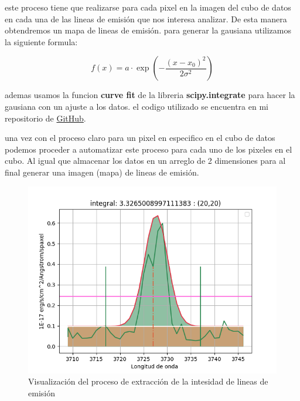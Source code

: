 \documentclass[9pt,twocolumn,a4paper]{opticajnl}
\begin{document}
este proceso tiene que realizarse para cada pixel en la imagen del cubo de datos en cada una de las lineas de emisión que nos interesa analizar. De esta manera obtendremos un mapa de lineas de emisión.
para generar la gausiana utilizamos la siguiente formula:

$$
f(x) = a \cdot \exp\left( -\frac{(x - x_0)^2}{2\sigma^2} \right)
$$

ademas usamos la funcion \textbf{curve fit} de la libreria \textbf{scipy.integrate} para hacer la gausiana con un ajuste a los datos.
el codigo utilizado se encuentra en mi repositorio de \href{https://github.com/renatosanz/delfin}{GitHub}. 

una vez con el proceso claro para un pixel en especifico en el cubo de datos podemos proceder a automatizar este proceso para cada uno de los pixeles en el cubo. Al igual que almacenar los datos en un arreglo de 2 dimensiones para al final generar una imagen (mapa) de lineas de emisión.

\begin{figure}
    \centering
    \includegraphics[width=1\linewidth]{extraccion_linea.png}
    \caption{Visualización del proceso de extracción de la intesidad de lineas de emisión}
    \label{fig:extraccion_linea.}
\end{figure}
\end{document}
